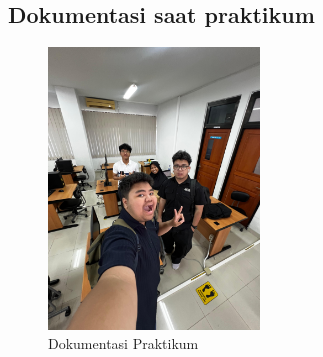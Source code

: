 \subsection{Dokumentasi saat praktikum}
\begin{figure}[h]
    \centering
    \includegraphics[width=0.5\textwidth]{dokum/dokum.jpg}
    \caption{Dokumentasi Praktikum}
    \label{fig:dokum}
\end{figure}